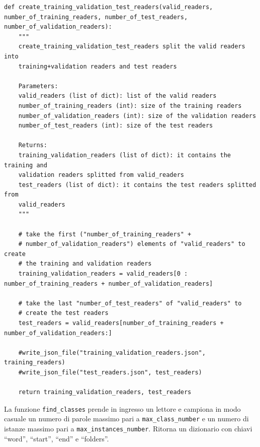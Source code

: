 \documentclass[12pt,a4paper,titlepage]{article}
\begin{document}
\begin{lstlisting}[language=iPython,firstnumber=72, caption=Funzione \texttt{create\_training\_validation\_test\_readers}, label=create_training_validation_test_readers,captionpos=b]
def create_training_validation_test_readers(valid_readers, number_of_training_readers, number_of_test_readers, number_of_validation_readers):
    """
    create_training_validation_test_readers split the valid readers into
    training+validation readers and test readers

    Parameters:
    valid_readers (list of dict): list of the valid readers
    number_of_training_readers (int): size of the training readers
    number_of_validation_readers (int): size of the validation readers
    number_of_test_readers (int): size of the test readers

    Returns:
    training_validation_readers (list of dict): it contains the training and
    validation readers splitted from valid_readers
    test_readers (list of dict): it contains the test readers splitted from 
    valid_readers
    """

    # take the first ("number_of_training_readers" + 
    # number_of_validation_readers") elements of "valid_readers" to create
    # the training and validation readers
    training_validation_readers = valid_readers[0 : number_of_training_readers + number_of_validation_readers]

    # take the last "number_of_test_readers" of "valid_readers" to
    # create the test readers
    test_readers = valid_readers[number_of_training_readers + number_of_validation_readers:]

    #write_json_file("training_validation_readers.json", training_readers)
    #write_json_file("test_readers.json", test_readers)

    return training_validation_readers, test_readers
\end{lstlisting}

La funzione \texttt{find\_classes} prende in ingresso un lettore e campiona in modo casuale un numero di parole massimo pari a \texttt{max\_class\_number} e un numero di istanze massimo pari a \texttt{max\_instances\_number}. Ritorna un dizionario con chiavi ``word'', ``start'', ``end'' e ``folders''.
\end{document}
